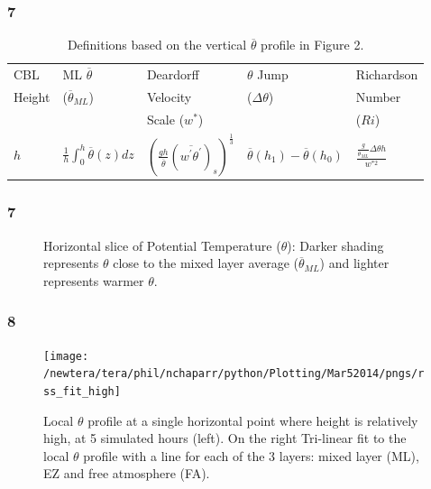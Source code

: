\documentclass{beamer}
\newcommand\FrameText[1]{
\begin{textblock}{16}(1,2.5)
\raggedright #1
\end{textblock}}
\begin{document}
\begin{frame}
\frametitle{7}
\begin{table}[htbp]
\caption[]{Definitions based on the vertical $\overline{\theta}$ profile in Figure 2.}
    \begin{center}
    \begin{tabular}{ p{.9cm} p{1.9cm} p{2cm}  p{2.3cm}  p{2cm}}
      CBL& ML $\overline{\theta}$ & Deardorff & $\theta$ Jump &Richardson\\
      Height&($\overline{\theta}_{ML}$)&Velocity&($\Delta \theta$)&Number\\
            &&Scale ($w^{*}$)&&($Ri$) \\ \hline 
       $h$  &$\frac{1}{h}\int^{h}_{0}\overline{\theta}(z)dz$ & $\left( \frac{gh}{\overline{\theta}}(\overline{w^{'}\theta^{'}})_{s} \right)^{\frac{1}{3}}$& $\overline{\theta}(h_{1})-\overline{\theta}(h_{0})$ & $\frac{\frac{g}{\overline{\theta}_{ML}}\Delta \theta h}{w^{*2}}$  \\ [.3cm] \hline
      \end{tabular}
\label{tab:reldefs}   
\end{center}    
\end{table}
\end{frame}

\begin{frame}
\frametitle{7}
 \begin{figure}[ht]
 \caption[]{Horizontal slice of Potential Temperature ($\theta$): Darker shading represents $\theta$ close to the mixed layer average ($\overline{\theta}_{ML}$) and lighter represents warmer $\theta$.}
 \end{figure}
\end{frame}

\begin{frame}
\frametitle{8}
\fontsize{12pt}{7.2}\selectfont
\vspace{3.25mm}
\begin{figure}
\centering
\texttt{[image: /newtera/tera/phil/nchaparr/python/Plotting/Mar52014/pngs/rss\_fit\_high]}
\caption{Local $\theta$ profile at a single horizontal point where height is relatively high, at 5 simulated hours (left).  On the right Tri-linear fit to the local $\theta$ profile with a line for each of the 3 layers: mixed layer (ML), EZ and free atmosphere (FA).}
\end{figure}
\end{frame}
\end{document}
